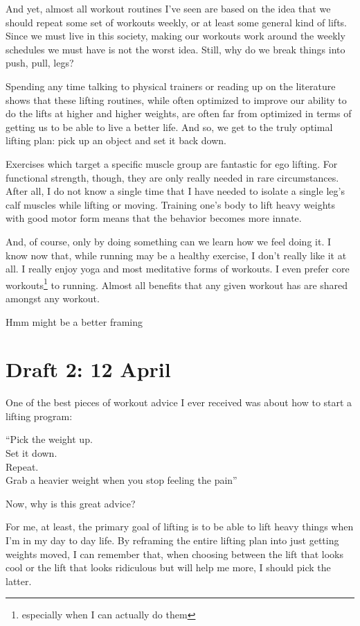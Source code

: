 \documentclass[12pt]{article}
\newcommand{\say}[1]{``#1''}
\renewcommand{\,}{\textsuperscript{,}}
\begin{document}
And yet, almost all workout routines I've seen are based on the idea that we should repeat some set of workouts weekly, or at least some general kind of lifts.  
Since we must live in this society, making our workouts work around the weekly schedules we must have is not the worst idea.  
Still, why do we break things into push, pull, legs?

Spending any time talking to physical trainers or reading up on the literature shows that these lifting routines, while often optimized to improve our ability to do the lifts at higher and higher weights, are often far from optimized in terms of getting us to be able to live a better life.  
And so, we get to the truly optimal lifting plan: pick up an object and set it back down.

Exercises which target a specific muscle group are fantastic for ego lifting.  
For functional strength, though, they are only really needed in rare circumstances.  
After all, I do not know a single time that I have needed to isolate a single leg's calf muscles while lifting or moving.  
Training one's body to lift heavy weights with good motor form means that the behavior becomes more innate.

And, of course, only by doing something can we learn how we feel doing it.  
I know now that, while running may be a healthy exercise, I don't really like it at all.  
I really enjoy yoga and most meditative forms of workouts.  
I even prefer core workouts\footnote{especially when I can actually do them} to running.  
Almost all benefits that any given workout has are shared amongst any workout.

Hmm might be a better framing

\section{Draft 2: 12 April}

One of the best pieces of workout advice I ever received was about how to start a lifting program:

\say{Pick the weight up.\\ Set it down.\\ Repeat.\\ Grab a heavier weight when you stop feeling the pain}

Now, why is this great advice?

For me, at least, the primary goal of lifting is to be able to lift heavy things when I'm in my day to day life.  
By reframing the entire lifting plan into just getting weights moved, I can remember that, when choosing between the lift that looks cool or the lift that looks ridiculous but will help me more, I should pick the latter.
\end{document}
